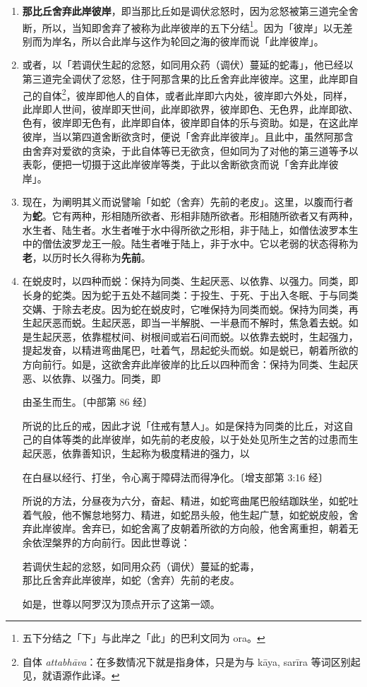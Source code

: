 \begin{enumerate}
\item \textbf{那比丘舍弃此岸彼岸}，即当那比丘如是调伏忿怒时，因为忿怒被第三道完全舍断，所以，当知即舍弃了被称为此岸彼岸的五下分结\footnote{五下分结之「下」与此岸之「此」的巴利文同为 ora。}。因为「彼岸」以无差别而为岸名，所以合此岸与这作为轮回之海的彼岸而说「此岸彼岸」。
\item 或者，以「若调伏生起的忿怒，如同用众药（调伏）蔓延的蛇毒」，他已经以第三道完全调伏了忿怒，住于阿那含果的比丘舍弃此岸彼岸。这里，此岸即自己的自体\footnote{自体 \textit{attabhāva}：在多数情况下就是指身体，只是为与 kāya, sarīra 等词区别起见，就语源作此译。}，彼岸即他人的自体，或者此岸即六内处，彼岸即六外处，同样，此岸即人世间，彼岸即天世间，此岸即欲界，彼岸即色、无色界，此岸即欲、色有，彼岸即无色有，此岸即自体，彼岸即自体的乐与资助。如是，在这此岸彼岸，当以第四道舍断欲贪时，便说「舍弃此岸彼岸」。且此中，虽然阿那含由舍弃对爱欲的贪染，于此自体等已无欲贪，但如同为了对他的第三道等予以表彰，便把一切摄于这此岸彼岸等类，于此以舍断欲贪而说「舍弃此岸彼岸」。
\item 现在，为阐明其义而说譬喻「如蛇（舍弃）先前的老皮」。这里，以腹而行者为\textbf{蛇}。它有两种，形相随所欲者、形相非随所欲者。形相随所欲者又有两种，水生者、陆生者。水生者唯于水中得所欲之形相，非于陆上，如僧佉波罗本生中的僧佉波罗龙王一般。陆生者唯于陆上，非于水中。它以老弱的状态得称为\textbf{老}，以历时长久得称为\textbf{先前}。
\item 在蜕皮时，以四种而蜕：保持为同类、生起厌恶、以依靠、以强力。同类，即长身的蛇类。因为蛇于五处不越同类：于投生、于死、于出入冬眠、于与同类交媾、于除去老皮。因为蛇在蜕皮时，它唯保持为同类而蜕。保持为同类，再生起厌恶而蜕。生起厌恶，即当一半解脱、一半悬而不解时，焦急着去蜕。如是生起厌恶，依靠棍杖间、树根间或岩石间而蜕。以依靠去蜕时，生起强力，提起发奋，以精进弯曲尾巴，吐着气，昂起蛇头而蜕。如是蜕已，朝着所欲的方向前行。如是，这欲舍弃此岸彼岸的比丘以四种而舍：保持为同类、生起厌恶、以依靠、以强力。同类，即\begin{quoting}由圣生而生。{\bluefootnotesize 〔中部第 86 经〕}\end{quoting}所说的比丘的戒，因此才说「住戒有慧人」。如是保持为同类的比丘，对这自己的自体等类的此岸彼岸，如先前的老皮般，以于处处见所生之苦的过患而生起厌恶，依靠善知识，生起称为极度精进的强力，以\begin{quoting}在白昼以经行、打坐，令心离于障碍法而得净化。{\bluefootnotesize 〔增支部第 3:16 经〕}\end{quoting}所说的方法，分昼夜为六分，奋起、精进，如蛇弯曲尾巴般结跏趺坐，如蛇吐着气般，他不懈怠地努力、精进，如蛇昂头般，他生起广慧，如蛇蜕皮般，舍弃此岸彼岸。舍弃已，如蛇舍离了皮朝着所欲的方向般，他舍离重担，朝着无余依涅槃界的方向前行。因此世尊说：\begin{quoting}若调伏生起的忿怒，如同用众药（调伏）蔓延的蛇毒，\\那比丘舍弃此岸彼岸，如蛇（舍弃）先前的老皮。\end{quoting}如是，世尊以阿罗汉为顶点开示了这第一颂。\end{enumerate}

